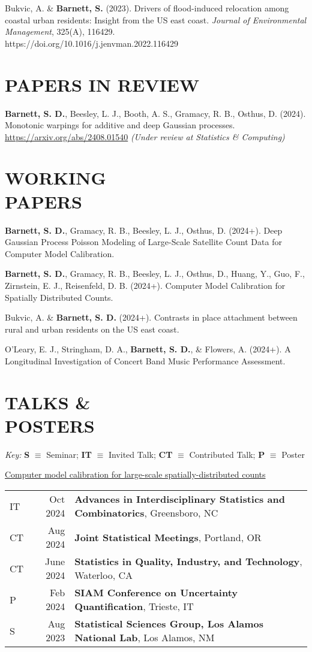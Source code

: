 \documentclass[margin,line]{res}
\begin{document}
\begin{resume}
Bukvic, A. \& \textbf{Barnett, S.} (2023). Drivers of flood-induced relocation among coastal urban residents: Insight from the US east coast. {\it Journal of Environmental Management}, 325(A), 116429.\\ https://doi.org/10.1016/j.jenvman.2022.116429

\section{\bf{PAPERS IN REVIEW}}

\textbf{Barnett, S. D.}, Beesley, L. J., Booth, A. S., Gramacy, R. B., Osthus, D. (2024). Monotonic warpings for additive and deep Gaussian processes. \href{https://arxiv.org/abs/2408.01540}{https://arxiv.org/abs/2408.01540} \textit{(Under review at Statistics \& Computing)}

\section{\bf{WORKING\\PAPERS}}

\textbf{Barnett, S. D.}, Gramacy, R. B., Beesley, L. J., Osthus, D. (2024+). Deep Gaussian Process Poisson Modeling of Large-Scale Satellite Count Data for Computer Model Calibration.

\textbf{Barnett, S. D.}, Gramacy, R. B., Beesley, L. J., Osthus, D., Huang, Y., Guo, F., Zirnstein, E. J., Reisenfeld, D. B. (2024+). Computer Model Calibration for Spatially Distributed Counts.

Bukvic, A. \& \textbf{Barnett, S. D.} (2024+). Contrasts in place attachment between rural and urban residents on the US east coast.

O'Leary, E. J., Stringham, D. A., \textbf{Barnett, S. D.}, \& Flowers, A. (2024+). A Longitudinal Investigation of Concert Band Music Performance Assessment.

\section{\bf TALKS \& \\POSTERS}
{\em Key:}
{\bf S} $\equiv$ Seminar;
{\bf IT} $\equiv$ Invited Talk;
{\bf CT} $\equiv$ Contributed Talk;
{\bf P} $\equiv$ Poster

\underline{Computer model calibration for large-scale spatially-distributed counts}\\
\begin{tabular}{lrl}
IT\quad\quad & Oct 2024 & {\bf Advances in Interdisciplinary Statistics and Combinatorics}, Greensboro, NC \\
CT\quad\quad & Aug 2024 & {\bf Joint Statistical Meetings}, Portland, OR \\
CT\quad\quad & June 2024 & {\bf Statistics in Quality, Industry, and Technology}, Waterloo, CA \\
P\quad\quad & Feb 2024 & {\bf SIAM Conference on Uncertainty Quantification}, Trieste, IT \\
S\quad\quad & Aug 2023 & {\bf Statistical Sciences Group, Los Alamos National Lab}, Los Alamos, NM \\
\end{tabular}


\end{resume}
\end{document}
